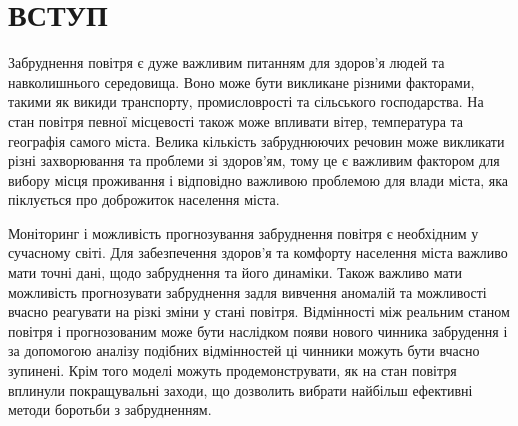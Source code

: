 \chapter*{ВСТУП}

Забруднення повітря є дуже важливим питанням для здоров'я людей та навколишнього середовища.
Воно може бути викликане різними факторами, такими як викиди транспорту, промисловрості та 
сільського господарства. На стан повітря певної місцевості також може впливати вітер, 
температура та географія самого міста. Велика кількість забруднюючих речовин може викликати 
різні захворювання та проблеми зі здоров'ям, тому це є важливим фактором для вибору місця 
проживання і відповідно важливою проблемою для влади міста, яка піклується про доброжиток 
населення міста.


Моніторинг і можливість прогнозування забруднення повітря є необхідним у сучасному світі. 
Для забезпечення здоров'я та комфорту населення міста важливо мати точні дані, щодо забруднення 
та його динаміки. Також важливо мати можливість прогнозувати забруднення задля вивчення 
аномалій та можливості вчасно реагувати на різкі зміни у стані повітря. Відмінності між 
реальним станом повітря і прогнозованим може бути наслідком появи нового чинника забрудення 
і за допомогою аналізу подібних відмінностей ці чинники можуть бути вчасно зупинені.
Крім того моделі можуть продемонструвати, як на стан повітря вплинули покращувальні заходи,
що дозволить вибрати найбільш ефективні методи боротьби з забрудненням. 
